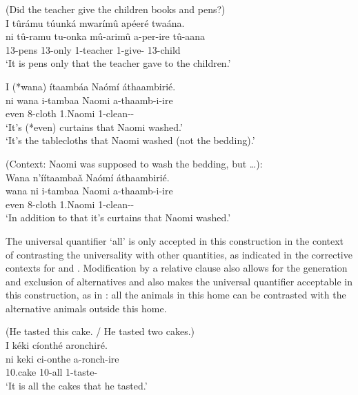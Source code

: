 \documentclass[output=paper]{langscibook}
\begin{document}
\ea
\label{bkm:Ref111803027}
(Did the teacher give the children books and pens?)\\
I tûrámu túunká mwarímû apéeré twaána.\\
\gll
ni  tû-ramu  tu-onka  mû-arimû  a-per-ire  tû-aana\\
\FOC{} 13-pens  13-only  1-teacher  1\SM{}-give-\PFV{} 13-child  \\
\glt
‘It is pens only that the teacher gave to the children.’

\z
\largerpage[-1]
\pagebreak
\ea
\label{bkm:Ref111803029}
\ea
\label{bkm:Ref111803029:a}
I (*wana) ítaambáa Naómí áthaambirié.\\
\gll
ni  wana  i-tambaa  Naomi  a-thaamb-i-ire\\
\FOC{} even  8-cloth  1.Naomi 1\SM{}-clean-\IC{}-\PFV\\
\glt
‘It’s (*even) curtains that Naomi washed.’\\
‘It’s the tablecloths that Naomi washed (not the bedding).’

\ex
\label{bkm:Ref111803029:b}
(Context: Naomi was supposed to wash the bedding, but …):\\
Wana n’íítaambaǎ Naómí áthaambirié.\\
\gll
wana  ni  i-tambaa  Naomi  a-thaamb-i-ire\\
even \FOC{} 8-cloth  1.Naomi 1\SM{}-clean-\IC{}-\PFV{}\\
\glt
‘In addition to that it’s curtains that Naomi washed.'

\z
\z

The universal quantifier ‘all’ is only accepted in this construction in the context of contrasting the universality with other quantities, as indicated in the corrective contexts for  and . Modification by a relative clause also allows for the generation and exclusion of alternatives and also makes the universal quantifier acceptable in this construction, as in : all the animals in this home can be contrasted with the alternative animals outside this home.

\ea
\label{bkm:Ref111806551}
(He tasted this cake. / He tasted two cakes.)\\
I kéki cíonthé aronchiré.\\
\gll
ni  keki  ci-onthe  a-ronch-ire\\
\FOC{} 10.cake  10-all 1\SM{}-taste-\PFV{}\\
\glt
‘It is all the cakes that he tasted.’
\end{document}
